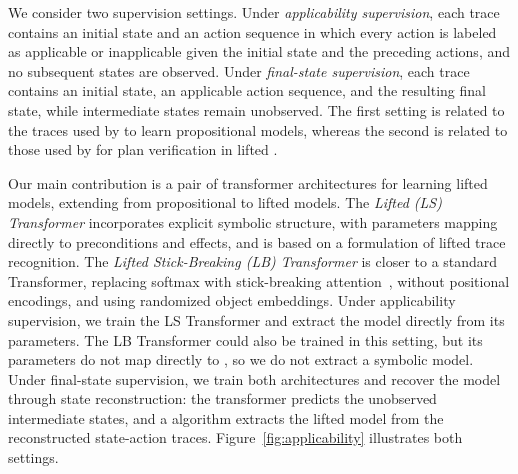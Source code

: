 
We consider two supervision settings.
Under \emph{applicability supervision}, each trace contains an initial state and an action sequence in which every action is labeled as applicable or inapplicable given the initial state and the preceding actions, and no subsequent states are observed.
Under \emph{final-state supervision}, each trace contains an initial state, an applicable action sequence, and the resulting final state, while intermediate states remain unobserved.
The first setting is related to the traces used by \citet{nunez2026strips} to learn propositional \strips models, whereas the second is related to those used by \citet{sarrof2026verify} for plan verification in lifted \strips.

Our main contribution is a pair of transformer architectures for learning lifted \strips models, extending \citet{nunez2026strips} from propositional to lifted models. 
The \emph{Lifted \strips (LS) Transformer} incorporates explicit symbolic structure, with parameters mapping directly to \strips preconditions and effects, and is based on a \brasp formulation of lifted \strips trace recognition. 
The \emph{Lifted Stick-Breaking (LB) Transformer} is closer to a standard Transformer, replacing softmax with stick-breaking attention~\citep{tan2025scaling}, without positional encodings, and using randomized object embeddings.
Under applicability supervision, we train the LS Transformer and extract the \strips model directly from its parameters.
The LB Transformer could also be trained in this setting, but its parameters do not map directly to \strips, so we do not extract a symbolic model.
Under final-state supervision, we train both architectures and recover the model through state reconstruction: the transformer predicts the unobserved intermediate states, and a algorithm extracts the lifted \strips model from the reconstructed state-action traces.
Figure~\ref{fig:applicability} illustrates both settings.


